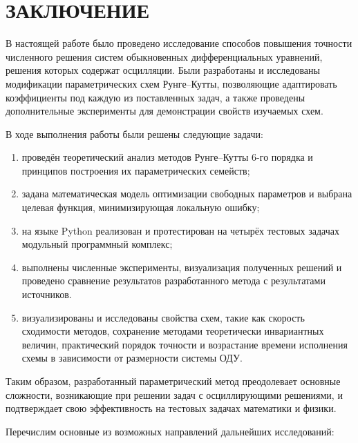 \newpage
\pagestyle{plain}

\section{\centering ЗАКЛЮЧЕНИЕ}


В настоящей работе было проведено исследование способов повышения точности численного решения систем обыкновенных дифференциальных уравнений, решения которых содержат осцилляции. Были разработаны и исследованы модификации параметрических схем Рунге--Кутты, позволяющие адаптировать коэффициенты под каждую из поставленных задач, а также проведены дополнительные эксперименты для демонстрации свойств изучаемых схем.

В ходе выполнения работы были решены следующие задачи:
\begin{enumerate}
	\item проведён теоретический анализ методов Рунге--Кутты 6-го порядка и принципов построения их параметрических семейств;
	\item задана математическая модель оптимизации свободных параметров и выбрана целевая функция, минимизирующая локальную ошибку;
	\item на языке Python реализован и протестирован на четырёх тестовых задачах модульный программный комплекс;
	\item выполнены численные эксперименты, визуализация полученных решений и проведено сравнение результатов разработанного метода с результатами источников.
	\item визуализированы и исследованы свойства схем, такие как скорость сходимости методов, сохранение методами теоретически инвариантных величин, практический порядок точности и возрастание времени исполнения схемы в зависимости от размерности системы ОДУ.
\end{enumerate}

Таким образом, разработанный параметрический метод преодолевает основные сложности, возникающие при решении задач с осциллирующими решениями, и подтверждает свою эффективность на тестовых задачах математики и физики.

Перечислим основные из возможных направлений дальнейших исследований:

